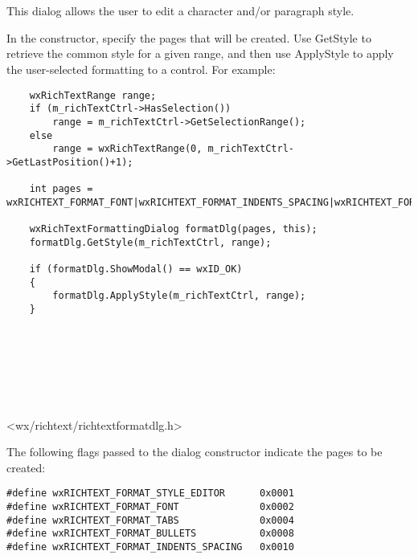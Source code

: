 \section{}\label{wxrichtextformattingdialog}

This dialog allows the user to edit a character and/or paragraph style.

In the constructor, specify the pages that will be created. Use GetStyle
to retrieve the common style for a given range, and then use ApplyStyle
to apply the user-selected formatting to a control. For example:

\begin{verbatim}
    wxRichTextRange range;
    if (m_richTextCtrl->HasSelection())
        range = m_richTextCtrl->GetSelectionRange();
    else
        range = wxRichTextRange(0, m_richTextCtrl->GetLastPosition()+1);

    int pages = wxRICHTEXT_FORMAT_FONT|wxRICHTEXT_FORMAT_INDENTS_SPACING|wxRICHTEXT_FORMAT_TABS|wxRICHTEXT_FORMAT_BULLETS;

    wxRichTextFormattingDialog formatDlg(pages, this);
    formatDlg.GetStyle(m_richTextCtrl, range);

    if (formatDlg.ShowModal() == wxID_OK)
    {
        formatDlg.ApplyStyle(m_richTextCtrl, range);
    }
\end{verbatim}
 

\\
\\
\\
\\
\\


<wx/richtext/richtextformatdlg.h>




The following flags passed to the dialog constructor indicate the pages to
be created:

\begin{verbatim}
#define wxRICHTEXT_FORMAT_STYLE_EDITOR      0x0001
#define wxRICHTEXT_FORMAT_FONT              0x0002
#define wxRICHTEXT_FORMAT_TABS              0x0004
#define wxRICHTEXT_FORMAT_BULLETS           0x0008
#define wxRICHTEXT_FORMAT_INDENTS_SPACING   0x0010
\end{verbatim}

